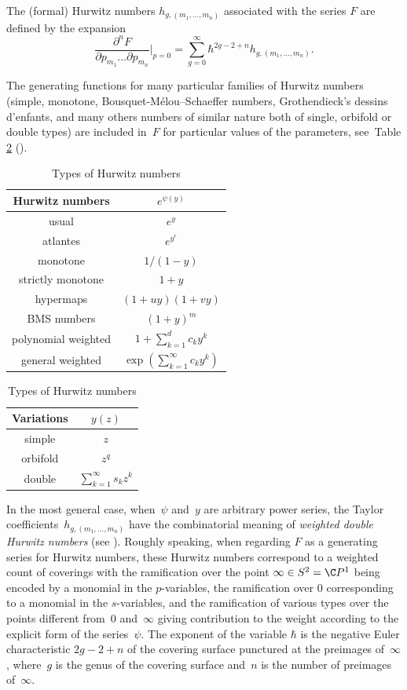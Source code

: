 The (formal) Hurwitz numbers $h_{g,(m_1,\dots,m_n)}$ associated with the series $F$ are defined by the expansion\vspace*{-5pt}
\begin{equation*}
\frac{\partial^n F}{\partial p_{m_1}\dots\partial p_{m_n}}\Big|_{p=0}=
\sum_{g=0}^\infty\hbar^{2g-2+n}h_{g,(m_1,\dots,m_n)}.
\end{equation*}

The generating functions for many particular families of Hurwitz numbers (\eg simple, monotone, Bousquet-Mélou--Schaeffer numbers, Grothendieck's dessins d'enfants, and many others numbers of similar nature both of single, orbifold or double types) are included in~$F$ for particular values of the parameters, see~Table \ref{tab:Hurw} (\cf \cite{ACEH-1,ALS,Harnad2014,KazLand}).
\begin{table}[htb]
\caption{Types of Hurwitz numbers}\label{tab:Hurw}
\renewcommand{\arraystretch}{1.3}
\begin{tabular}{|c|c|}
\hline
Hurwitz numbers & $e^{\psi(y)}$\\
\hline
\hline
usual & $e^{y}$ \\
atlantes
& $e^{y^r}$ \\
monotone & $1/(1-y)$ \\
strictly monotone & $1+y$ \\
hypermaps & $(1+uy)(1+vy)$\\
BMS numbers & $(1+y)^m$ \\
polynomial weighted& $1+\sum_{k=1}^d c_k y^k$\\
\hline
general weighted & $\exp\left({\sum_{k=1}^\infty c_k y^k}\right)$\\
\hline
\end{tabular} \quad \begin{tabular}{|c|c|}
\hline
Variations & $y(z)$\\
\hline
\hline
simple & $z$ \\
orbifold & $z^q$ \\
\hline
double & $\sum_{k=1}^\infty s_kz^k$ \\
\hline
\end{tabular}
\end{table}

In the most general case, when~$\psi$ and~$y$ are arbitrary power series, the Taylor coefficients~$h_{g,(m_1,\dots,m_n)}$ have the combinatorial meaning of \emph{weighted double Hurwitz numbers} (see \eg \cite{Harnad2014}).
Roughly speaking, when regarding $F$ as a generating series for Hurwitz numbers, these Hurwitz numbers correspond to a weighted count of coverings with the ramification over the point $\infty\in S^2=\C P^1$ being encoded by a monomial in the $p$-variables, the ramification over $0$ corresponding to a monomial in the $s$\nobreakdash-variables, and the ramification of various types over the points different from~$0$ and~$\infty$ giving contribution to the weight according to the explicit form of the series~$\psi$. The exponent of the variable $\hbar$ is the negative Euler characteristic $2g-2+n$ of the covering surface punctured at the preimages of~$\infty$, where~$g$ is the genus of the covering surface and~$n$ is the number of preimages of~$\infty$.

